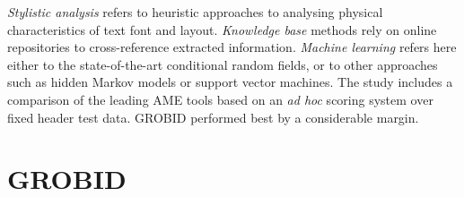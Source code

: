 \emph{Stylistic analysis} refers to heuristic approaches to analysing physical characteristics of text font and layout. \emph{Knowledge base} methods rely on online repositories to cross-reference extracted information. \emph{Machine learning} refers here either to the state-of-the-art conditional random fields, or to other approaches such as hidden Markov models or support vector machines. The study includes a comparison of the leading AME tools based on an \emph{ad hoc} scoring system over fixed header test data. GROBID performed best by a considerable margin.


\section{GROBID}
\label{sec:grobid}

